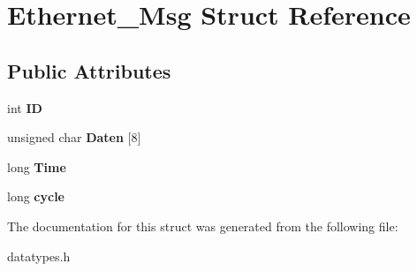 \hypertarget{struct_ethernet___msg}{}\section{Ethernet\+\_\+\+Msg Struct Reference}
\label{struct_ethernet___msg}
\subsection*{Public Attributes}
\begin{DoxyCompactItemize}
\item 
\hypertarget{struct_ethernet___msg_a925a479308600816da6581be917aace3}{}int {\bfseries I\+D}\label{struct_ethernet___msg_a925a479308600816da6581be917aace3}

\item 
\hypertarget{struct_ethernet___msg_a2f7005ea731c396c9e66e1e8a1c282f9}{}unsigned char {\bfseries Daten} \mbox{[}8\mbox{]}\label{struct_ethernet___msg_a2f7005ea731c396c9e66e1e8a1c282f9}

\item 
\hypertarget{struct_ethernet___msg_a701494032f877c3db22713559e102550}{}long {\bfseries Time}\label{struct_ethernet___msg_a701494032f877c3db22713559e102550}

\item 
\hypertarget{struct_ethernet___msg_aa00081599fbe68ee458133039ab0c5d0}{}long {\bfseries cycle}\label{struct_ethernet___msg_aa00081599fbe68ee458133039ab0c5d0}

\end{DoxyCompactItemize}


The documentation for this struct was generated from the following file\+:\begin{DoxyCompactItemize}
\item 
datatypes.\+h\end{DoxyCompactItemize}
